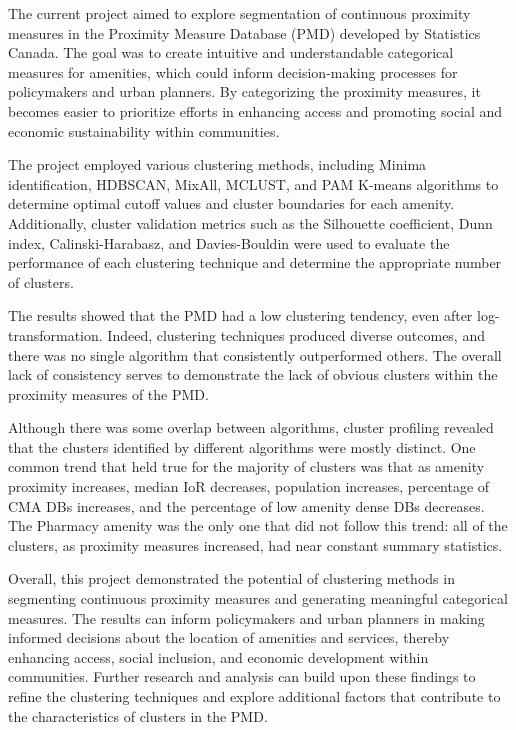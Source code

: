 \documentclass[11pt, a4paper]{article}
\begin{document}
The current project aimed to explore segmentation of continuous proximity measures in the Proximity Measure Database (PMD) developed by Statistics Canada. The goal was to create intuitive and understandable categorical measures for amenities, which could inform decision-making processes for policymakers and urban planners. By categorizing the proximity measures, it becomes easier to prioritize efforts in enhancing access and promoting social and economic sustainability within communities.
\par
The project employed various clustering methods, including Minima identification, HDBSCAN, MixAll, MCLUST, and PAM K-means algorithms to determine optimal cutoff values and cluster boundaries for each amenity. Additionally, cluster validation metrics such as the Silhouette coefficient, Dunn index, Calinski-Harabasz, and Davies-Bouldin were used to evaluate the performance of each clustering technique and determine the appropriate number of clusters.
\par
The results showed that the PMD had a low clustering tendency, even after log-transformation. Indeed, clustering techniques produced diverse outcomes, and there was no single algorithm that consistently outperformed others. The overall lack of consistency  serves to demonstrate the lack of obvious clusters within the proximity measures of the PMD.
\par
Although there was some overlap between algorithms, cluster profiling revealed that the clusters identified by different algorithms were mostly distinct. One common trend that held true for the majority of clusters was that as amenity proximity increases, median IoR decreases, population increases, percentage of CMA DBs increases, and the percentage of low amenity dense DBs decreases. The Pharmacy amenity was the only one that did not follow this trend: all of the clusters, as proximity measures increased, had near constant summary statistics.
\par
Overall, this project demonstrated the potential of clustering methods in segmenting continuous proximity measures and generating meaningful categorical measures. The results can inform policymakers and urban planners in making informed decisions about the location of amenities and services, thereby enhancing access, social inclusion, and economic development within communities. Further research and analysis can build upon these findings to refine the clustering techniques and explore additional factors that contribute to the characteristics of clusters in the PMD.
\end{document}

